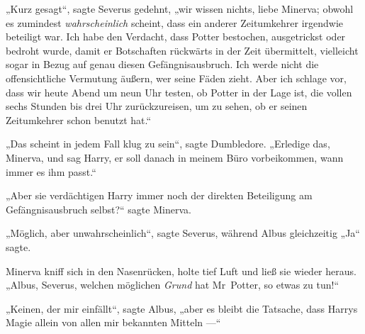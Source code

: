 „Kurz gesagt“, sagte Severus gedehnt, „wir wissen nichts, liebe Minerva; obwohl es zumindest \emph{wahrscheinlich} scheint, dass ein anderer Zeitumkehrer irgendwie beteiligt war. Ich habe den Verdacht, dass Potter bestochen, ausgetrickst oder bedroht wurde, damit er Botschaften rückwärts in der Zeit übermittelt, vielleicht sogar in Bezug auf genau diesen Gefängnisausbruch. Ich werde nicht die offensichtliche Vermutung äußern, wer seine Fäden zieht. Aber ich schlage vor, dass wir heute Abend um neun Uhr testen, ob Potter in der Lage ist, die vollen sechs Stunden bis drei Uhr zurückzureisen, um zu sehen, ob er seinen Zeitumkehrer schon benutzt hat.“

„Das scheint in jedem Fall klug zu sein“, sagte Dumbledore.
„Erledige das, Minerva, und sag Harry, er soll danach in meinem Büro vorbeikommen, wann immer es ihm passt.“

„Aber sie verdächtigen Harry immer noch der direkten Beteiligung am Gefängnisausbruch selbst?“ sagte Minerva.

„Möglich, aber unwahrscheinlich“, sagte Severus, während Albus gleichzeitig
„Ja“ sagte.

Minerva kniff sich in den Nasenrücken, holte tief Luft und ließ sie wieder heraus.
„Albus, Severus, welchen möglichen \emph{Grund} hat Mr~Potter, so etwas zu tun!“

„Keinen, der mir einfällt“, sagte Albus, „aber es bleibt die Tatsache, dass Harrys Magie allein von allen mir bekannten Mitteln —“

